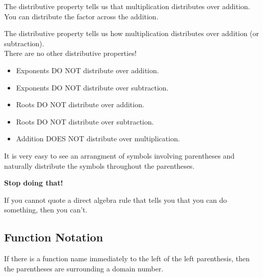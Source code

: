 \documentclass{ximera}
\begin{document}
The distributive property tells us that multiplication distributes over addition.  You can distribute the factor across the addition. \\





\begin{warning}

The distributive property tells us how multiplication distributes over addition (or subtraction). \\


There are no other distributive properties! \\

\begin{itemize}
    \item Exponents DO NOT distribute over addition.
    \item Exponents DO NOT distribute over subtraction.
    \item Roots DO NOT distribute over addition.
    \item Roots DO NOT distribute over subtraction.
    \item Addition DOES NOT distribute over multiplication.
\end{itemize}


It is very easy to see an arrangment of symbols involving parentheses and naturally distribute the symbols throughout the parentheses. \\

\begin{center}

\textbf{Stop doing that!}

\end{center}



If you cannot quote a direct algebra rule that tells you that you can do something, then you can't.


\end{warning}














\subsection*{Function Notation}


If there is a function name immediately to the left of the left parenthesis, then the parentheses are surrounding a domain number.   \\
\end{document}
